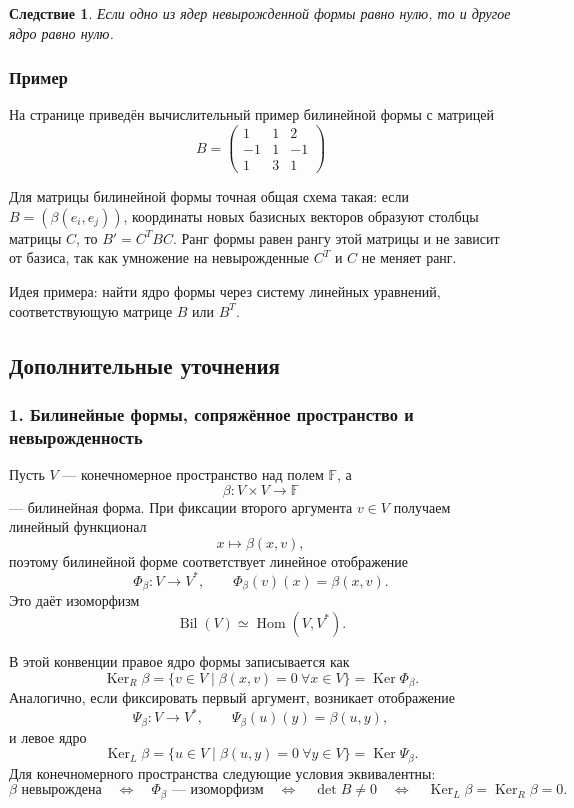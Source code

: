 \documentclass[12pt,a4paper]{article}
\theoremstyle{definition}
\theoremstyle{plain}
\newtheorem{corollary}[definition]{Следствие}
\theoremstyle{remark}
\newenvironment{knowledgefix}{\begin{clarifybox}}{\end{clarifybox}}
\newcommand{\F}{\mathbb{F}}
\newcommand{\Hom}{\operatorname{Hom}}
\newcommand{\Ker}{\operatorname{Ker}}
\begin{document}
\begin{corollary}
Если одно из ядер невырожденной формы равно нулю, то и другое ядро равно нулю.
\end{corollary}

\subsubsection*{Пример}

На странице приведён вычислительный пример билинейной формы с матрицей
\[
    B=\begin{pmatrix}
        1 & 1 & 2\\
        -1 & 1 & -1\\
        1 & 3 & 1
    \end{pmatrix}
\]
\begin{knowledgefix}
Для матрицы билинейной формы точная общая схема такая: если \(B=(\beta(e_i,e_j))\), координаты новых базисных векторов образуют столбцы матрицы \(C\), то \(B'=C^TBC\). Ранг формы равен рангу этой матрицы и не зависит от базиса, так как умножение на невырожденные \(C^T\) и \(C\) не меняет ранг.
\end{knowledgefix}

Идея примера: найти ядро формы через систему линейных уравнений, соответствующую матрице $B$ или $B^T$.

\subsection*{Дополнительные уточнения}

\subsubsection*{1. Билинейные формы, сопряжённое пространство и невырожденность}
Пусть $V$ --- конечномерное пространство над полем $\F$, а
\[
    \beta:V\times V\to \F
\]
--- билинейная форма. При фиксации второго аргумента $v\in V$ получаем линейный функционал
\[
    x\mapsto \beta(x,v),
\]
поэтому билинейной форме соответствует линейное отображение
\[
    \Phi_\beta:V\to V^*,\qquad
    \Phi_\beta(v)(x)=\beta(x,v).
\]
Это даёт изоморфизм
\[
    \operatorname{Bil}(V)\simeq \Hom(V,V^*).
\]

В этой конвенции правое ядро формы записывается как
\[
    \Ker_R\beta=\{v\in V\mid \beta(x,v)=0\ \forall x\in V\}=\Ker \Phi_\beta.
\]
Аналогично, если фиксировать первый аргумент, возникает отображение
\[
    \Psi_\beta:V\to V^*,\qquad \Psi_\beta(u)(y)=\beta(u,y),
\]
и левое ядро
\[
    \Ker_L\beta=\{u\in V\mid \beta(u,y)=0\ \forall y\in V\}=\Ker\Psi_\beta.
\]
Для конечномерного пространства следующие условия эквивалентны:
\[
    \beta\text{ невырождена}
    \quad\Longleftrightarrow\quad
    \Phi_\beta\text{ --- изоморфизм}
    \quad\Longleftrightarrow\quad
    \det B\ne 0
    \quad\Longleftrightarrow\quad
    \Ker_L\beta=\Ker_R\beta=0.
\]
\end{document}
